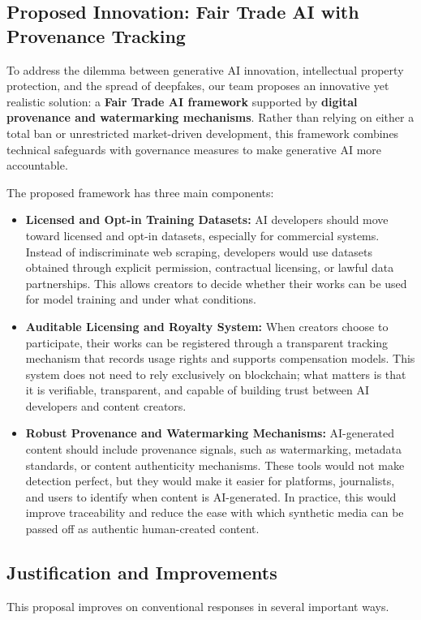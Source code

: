 \subsection{Proposed Innovation: Fair Trade AI with Provenance Tracking}
To address the dilemma between generative AI innovation, intellectual property protection, and the spread of deepfakes, our team proposes an innovative yet realistic solution: a \textbf{Fair Trade AI framework} supported by \textbf{digital provenance and watermarking mechanisms}. Rather than relying on either a total ban or unrestricted market-driven development, this framework combines technical safeguards with governance measures to make generative AI more accountable.

The proposed framework has three main components:
\begin{itemize}
    \item \textbf{Licensed and Opt-in Training Datasets:} AI developers should move toward licensed and opt-in datasets, especially for commercial systems. Instead of indiscriminate web scraping, developers would use datasets obtained through explicit permission, contractual licensing, or lawful data partnerships. This allows creators to decide whether their works can be used for model training and under what conditions.

    \item \textbf{Auditable Licensing and Royalty System:} When creators choose to participate, their works can be registered through a transparent tracking mechanism that records usage rights and supports compensation models. This system does not need to rely exclusively on blockchain; what matters is that it is verifiable, transparent, and capable of building trust between AI developers and content creators.

    \item \textbf{Robust Provenance and Watermarking Mechanisms:} AI-generated content should include provenance signals, such as watermarking, metadata standards, or content authenticity mechanisms. These tools would not make detection perfect, but they would make it easier for platforms, journalists, and users to identify when content is AI-generated. In practice, this would improve traceability and reduce the ease with which synthetic media can be passed off as authentic human-created content.
\end{itemize}

\subsection{Justification and Improvements}
This proposal improves on conventional responses in several important ways. \\

